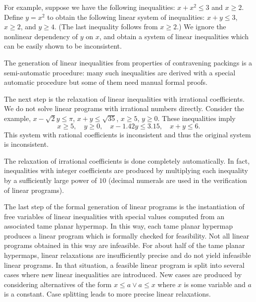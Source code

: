 For example, suppose we have the following inequalities: $x + x^2 \le
3$ and $x \ge 2$. Define $y = x^2$ to obtain the following linear
system of inequalities: $x + y \le 3$, $x \ge 2$, and $y \ge 4$.  (The
last inequality follows from $x \ge 2$.)  We ignore the nonlinear
dependency of $y$ on $x$, and obtain a system of linear inequalities
which can be easily shown to be inconsistent.

The generation of linear inequalities from properties of contravening
packings is a semi-automatic procedure: many such inequalities are
derived with a special automatic procedure but some of them need
manual formal proofs.

The next step is the relaxation of linear inequalities with irrational
coefficients. We do not solve linear programs with irrational numbers
directly.  Consider the example, $x - \sqrt{2} y \le \pi$, $x + y \le
\sqrt{35}$, $x \ge 5$, $y \ge 0$. These inequalities imply
\begin{equation*}\label{eqn:35}
x\ge 5, \quad
y \ge 0, \quad
x - 1.42 y \le 3.15,\quad
x + y \le 6.
\end{equation*}
This system with rational coefficients is inconsistent and thus
the original system is inconsistent.

The relaxation of irrational coefficients is done completely
automatically. In fact, inequalities with integer coefficients are
produced by multiplying each inequality by a sufficiently large power
of $10$ (decimal numerals are used in the verification of linear
programs).

The last step of the formal generation of linear programs is the
instantiation of free variables of linear inequalities with special
values computed from an associated tame planar hypermap. In this way,
each tame planar hypermap produces a linear program which is formally
checked for feasibility. Not all linear programs obtained in this way
are infeasible.  For about half of the tame planar hypermaps, linear
relaxations are insufficiently precise and do not yield infeasible
linear programs.  In that situation, a feasible linear program is
split into several cases where new linear inequalities are
introduced. New cases are produced by considering alternatives of the
form $x \le a \vee a \le x$ where $x$ is some variable and $a$ is a
constant.  Case splitting leads to more precise linear relaxations.

